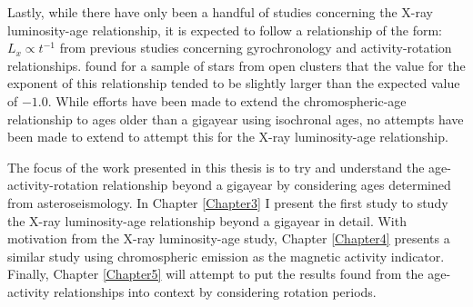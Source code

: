 Lastly, while there have only been a handful of studies concerning the X-ray luminosity-age relationship, it is expected to follow a relationship of the form: $L_{x} \propto t^{-1}$ from previous studies concerning gyrochronology and activity-rotation relationships. \citet{Jackson_etal_2012} found for a sample of stars from open clusters that the value for the exponent of this relationship tended to be slightly larger than the expected value of $-1.0$. While efforts have been made to extend the chromospheric-age relationship to ages older than a gigayear using isochronal ages, no attempts have been made to extend to attempt this for the X-ray luminosity-age relationship.

The focus of the work presented in this thesis is to try and understand the age-activity-rotation relationship beyond a gigayear by considering ages determined from asteroseismology. In Chapter \ref{Chapter3} I present the first study to study the X-ray luminosity-age relationship beyond a gigayear in detail. With motivation from the X-ray luminosity-age study, Chapter \ref{Chapter4} presents a similar study using chromospheric emission as the magnetic activity indicator. Finally, Chapter \ref{Chapter5} will attempt to put the results found from the age-activity relationships into context by considering rotation periods.